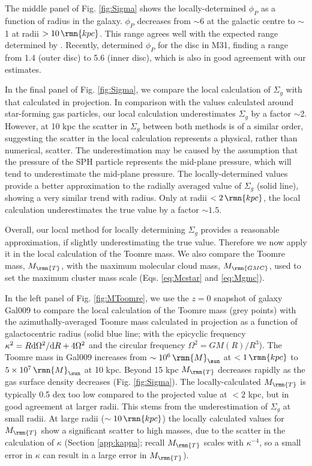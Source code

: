 \documentclass[fleqn,usenatbib]{mnras}
\newcommand\Msun{\,\rmn{M}_{\sun}}
\newcommand\kpc{\,\rmn{kpc}}
\newcommand{\Mtoomre}{M_\rmn{T}}
\newcommand{\Mgmc}{M_\rmn{GMC}}
\begin{document}
The middle panel of Fig. \ref{fig:Sigma} shows the locally-determined $\phi_P$ as a function of radius in the galaxy. $\phi_P$ decreases from $\sim$6 at the galactic centre to $\sim$1 at radii $>10\kpc$. This range agrees well with the expected range determined by \citet{Krumholz_and_McKee_05}. Recently, \citet{Johnson_et_al_16} determined $\phi_P$ for the disc in M31, finding a range from 1.4 (outer disc) to 5.6 (inner disc), which is also in good agreement with our estimates.

In the final panel of Fig. \ref{fig:Sigma}, we compare the local calculation of $\Sigma_g$ with that calculated in projection. 
In comparison with the values calculated around star-forming gas particles, our local calculation underestimates $\Sigma_g$ by a factor $\sim$2. However, at 10 kpc the scatter in $\Sigma_g$ between both methods is of a similar order, suggesting the scatter in the local calculation represents a physical, rather than numerical, scatter. The underestimation may be caused by the assumption that the pressure of the SPH particle represents the mid-plane pressure, which will tend to underestimate the mid-plane pressure.
The locally-determined values provide a better approximation to the radially averaged value of $\Sigma_g$ (solid line), showing a very similar trend with radius. Only at radii $<2\kpc$, the local calculation underestimates the true value by a factor $\sim 1.5$.

Overall, our local method for locally determining $\Sigma_g$ provides a reasonable approximation, if slightly underestimating the true value. Therefore we now apply it in the local calculation of the Toomre mass. We also compare the Toomre mass, $\Mtoomre$, with the maximum molecular cloud mass, $\Mgmc$, used to set the maximum cluster mass scale (Eqs. \ref{eq:Mcstar} and \ref{eq:Mgmc}).

In the left panel of Fig. \ref{fig:MToomre}, we use the $z=0$ snapshot of galaxy Gal009 to compare the local calculation of the Toomre mass (grey points) with the azimuthally-averaged Toomre mass calculated in projection as a function of galactocentric radius (solid blue line; with the epicyclic frequency $\kappa^2 = R {\rm d}\Omega^2 / {\rm d}R + 4 \Omega^2$ and the circular frequency $\Omega^2 = G M(R) / R^3$).
The Toomre mass in Gal009 increases from $\sim10^6 \Msun$ at $<1\kpc$ to $5\times10^7 \Msun$ at 10 kpc. Beyond 15 kpc $\Mtoomre$ decreases rapidly as the gas surface density decreases (Fig. \ref{fig:Sigma}). 
The locally-calculated $\Mtoomre$ is typically 0.5 dex too low compared to the projected value at $<2$ kpc, but in good agreement at larger radii.  This stems from the underestimation of $\Sigma_g$ at small radii.
At large radii ($\sim 10 \kpc$) the locally calculated values for $\Mtoomre$ show a significant scatter to high masses, due to the scatter in the calculation of $\kappa$ (Section \ref{app:kappa}; recall $\Mtoomre$ scales with $\kappa^{-4}$, so a small error in $\kappa$ can result in a large error in $\Mtoomre$). 
\end{document}
